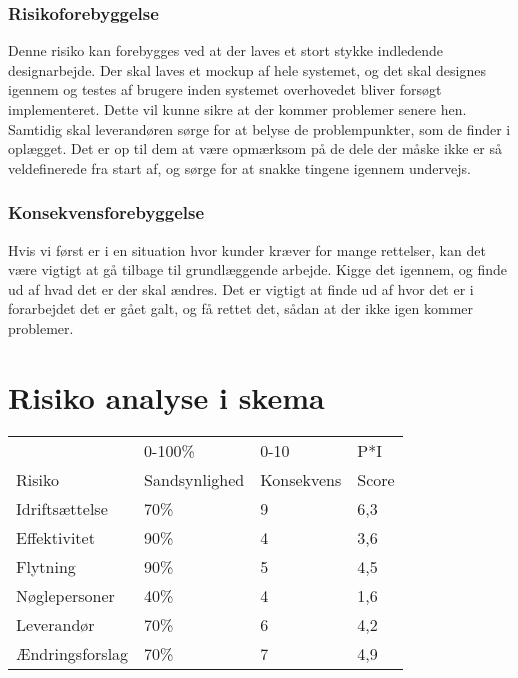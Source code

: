 \documentclass[10pt,a4paper,danish]{article}
\begin{document}
\subsubsection{Risikoforebyggelse}
Denne risiko kan forebygges ved at der laves et stort stykke indledende designarbejde. Der skal laves et mockup af hele systemet, og det skal designes igennem og testes af brugere inden systemet overhovedet bliver forsøgt implementeret. Dette vil kunne sikre at der kommer problemer senere hen. Samtidig skal leverandøren sørge for at belyse de problempunkter, som de finder i oplægget. Det er op til dem at være opmærksom på de dele der måske ikke er så veldefinerede fra start af, og sørge for at snakke tingene igennem undervejs.

\subsubsection{Konsekvensforebyggelse}
Hvis vi først er i en situation hvor kunder kræver for mange rettelser, kan det være vigtigt at gå tilbage til grundlæggende arbejde. Kigge det igennem, og finde ud af hvad det er der skal ændres. Det er vigtigt at finde ud af hvor det er i forarbejdet det er gået galt, og få rettet det, sådan at der ikke igen kommer problemer.

\section{Risiko analyse i skema}
\begin{tabular}{l|l|l|l}
           & 0-100\%       & 0-10       & P*I   \\
Risiko     & Sandsynlighed & Konsekvens & Score \\\hline
Idriftsættelse & 70\% & 9 & 6,3 \\
Effektivitet   & 90\% & 4 & 3,6 \\
Flytning   & 90\% & 5 & 4,5 \\
Nøglepersoner & 40\% & 4 & 1,6 \\
Leverandør & 70\% & 6 & 4,2\\
Ændringsforslag & 70\% & 7 & 4,9 \\
\end{tabular}
\end{document}

